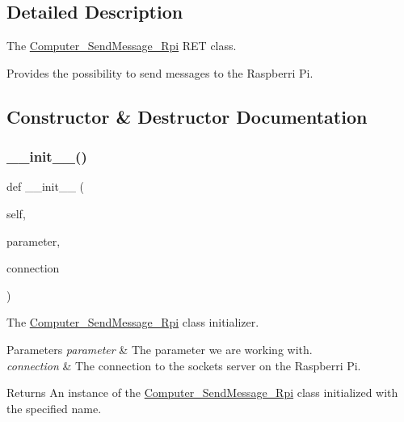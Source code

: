 \subsection{Detailed Description}
The \hyperlink{classRET__socket_1_1Computer__SendMessage__Rpi}{Computer\+\_\+\+Send\+Message\+\_\+\+Rpi} R\+ET class. 

Provides the possibility to send messages to the Raspberri Pi. 

\subsection{Constructor \& Destructor Documentation}
\mbox{\label{classRET__socket_1_1Computer__SendMessage__Rpi_a1370d57533cdac08e579f9012c0bcd7d}} 
\subsubsection{\texorpdfstring{\+\_\+\+\_\+init\+\_\+\+\_\+()}{\_\_init\_\_()}}
{\footnotesize\ttfamily def \+\_\+\+\_\+init\+\_\+\+\_\+ (\begin{DoxyParamCaption}\item[{}]{self,  }\item[{}]{parameter,  }\item[{}]{connection }\end{DoxyParamCaption})}



The \hyperlink{classRET__socket_1_1Computer__SendMessage__Rpi}{Computer\+\_\+\+Send\+Message\+\_\+\+Rpi} class initializer. 


\begin{DoxyParams}{Parameters}
{\em parameter} & The parameter we are working with. \\
\hline
{\em connection} & The connection to the socket\textquotesingle{}s server on the Raspberri Pi. \\
\hline
\end{DoxyParams}
\begin{DoxyReturn}{Returns}
An instance of the \hyperlink{classRET__socket_1_1Computer__SendMessage__Rpi}{Computer\+\_\+\+Send\+Message\+\_\+\+Rpi} class initialized with the specified name. 
\end{DoxyReturn}


